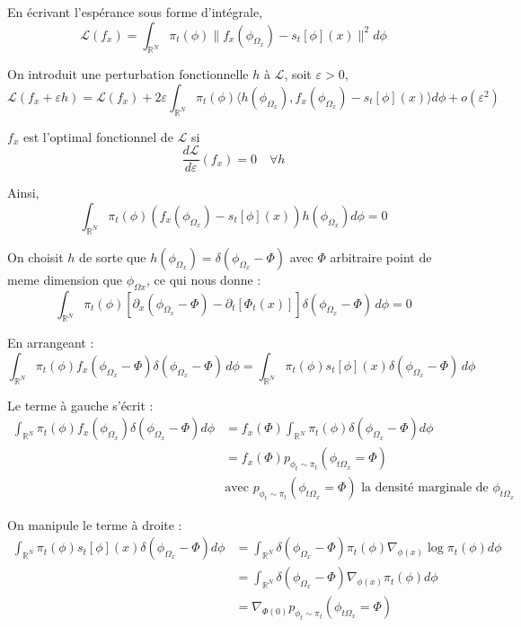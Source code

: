 \documentclass[a4paper,10pt]{article}
\theoremstyle{definition} %
\theoremstyle{definition} %
\theoremstyle{definition} %
\theoremstyle{definition} %
\begin{document}
En écrivant l'espérance sous forme d'intégrale,
\[ \mathcal{L}(f_x) = \int_{\mathbb{R}^N} \pi_t(\phi) \| f_x(\phi_{\Omega_x}) - s_t[\phi](x) \|^2 d\phi \]

On introduit une perturbation fonctionnelle $h$ à $\mathcal{L}$, soit $\varepsilon > 0$,
\[ \mathcal{L}(f_x + \varepsilon h) = \mathcal{L}(f_x) + 2\varepsilon \int_{\mathbb{R}^N} \pi_t(\phi) \langle h(\phi_{\Omega_x}), f_x(\phi_{\Omega_x}) - s_t[\phi](x) \rangle d\phi + o(\varepsilon^2) \]

$f_x$ est l'optimal fonctionnel de $\mathcal{L}$ si
\[ \frac{d\mathcal{L}}{d\varepsilon}(f_x) = 0 \quad \forall h \]

Ainsi,
\[ \int_{\mathbb{R}^N} \pi_t(\phi) (f_x(\phi_{\Omega_x}) - s_t[\phi](x)) h(\phi_{\Omega_x}) d\phi = 0 \]

On choisit $h$ de sorte que $h(\phi_{\Omega_x}) = \delta(\phi_{\Omega_x} - \Phi)$ avec $\Phi$ arbitraire point de meme dimension que $\phi_{\Omega x}$, ce qui nous donne :
\[
\int_{\mathbb{R}^N} \pi_t (\phi) \left[ \partial_x (\phi_{\Omega_x} - \Phi) - \partial_t \left[ \Phi_t(x) \right] \right] \delta(\phi_{\Omega_x} - \Phi) \, d\phi = 0
\]

En arrangeant :
\[
\int_{\mathbb{R}^N} \pi_t (\phi) f_x (\phi_{\Omega_x} - \Phi) \delta(\phi_{\Omega_x} - \Phi) \, d\phi
= \int_{\mathbb{R}^N} \pi_t (\phi) s_t[\phi](x)\delta(\phi_{\Omega_x} - \Phi) \, d\phi
\]

Le terme à gauche s'écrit :
\begin{align*}
\int_{\mathbb{R}^N} \pi_t(\phi) f_x(\phi_{\Omega_x}) \delta(\phi_{\Omega_x} - \Phi) d\phi &= f_x(\Phi) \int_{\mathbb{R}^N} \pi_t(\phi) \delta(\phi_{\Omega_x} - \Phi) d\phi \\
&= f_x(\Phi) p_{\phi_t \sim \pi_t} (\phi_{t \Omega_x} = \Phi)\\
& \text{avec } p_{\phi_t \sim \pi_t} (\phi_{t \Omega_x} = \Phi) \text{ la densité marginale de }\phi_{t \Omega_x}
\end{align*}

On manipule le terme à droite :
\begin{align*}
\int_{\mathbb{R}^N} \pi_t(\phi) s_t[\phi](x) \delta(\phi_{\Omega_x} - \Phi) d\phi &= \int_{\mathbb{R}^N} \delta(\phi_{\Omega_x} - \Phi) \pi_t(\phi) \nabla_{\phi(x)} \log \pi_t(\phi) d\phi \\
&= \int_{\mathbb{R}^N} \delta(\phi_{\Omega_x} - \Phi) \nabla_{\phi(x)} \pi_t(\phi) d\phi \\
&= \nabla_{\Phi(0)} p_{\phi_t \sim \pi_t} (\phi_{t \Omega_x} = \Phi)
\end{align*}
\end{document}
